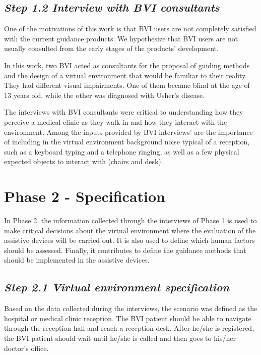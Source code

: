     \subsection*{\textit{Step 1.2 Interview with BVI consultants}}
    
        One of the motivations of this work is that BVI users are not completely satisfied with the current guidance products. We hypothesize that BVI users are not usually consulted from the early stages of the products' development.

        In this work, two BVI acted as consultants for the proposal of guiding methods and the design of a virtual environment that would be familiar to their reality. They had different visual impairments. One of them became blind at the age of 13 years old, while the other was diagnosed with Usher's disease. 

        The interviews with BVI consultants were critical to understanding how they perceive a medical clinic as they walk in and how they interact with the environment. Among the inputs provided by BVI interviews' are the importance of including in the virtual environment background noise typical of a reception, such as a keyboard typing and a telephone ringing, as well as a few physical expected objects to interact with (chairs and desk).
    

\section{Phase 2 - Specification}
\label{sec:idealization_phase}
    In Phase 2, the information collected through the interviews of Phase 1 is used to make critical decisions about the virtual environment where the evaluation of the assistive devices will be carried out. It is also used to define which human factors should be assessed. Finally, it contributes to define the guidance methods that should be implemented in the assistive devices.
    

    \subsection*{\textit{Step 2.1 Virtual environment specification}}
        Based on the data collected during the interviews, the scenario was defined as the hospital or medical clinic reception. The BVI patient should be able to navigate through the reception hall and reach a reception desk. After he/she is registered, the BVI patient should wait until he/she is called and then goes to his/her doctor’s office.

